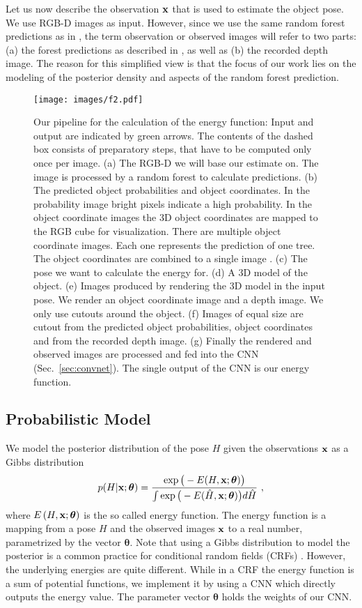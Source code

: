 \documentclass[10pt,letterpaper]{article}
\newcommand{\btheta}{\boldsymbol\theta}
\newcommand{\bx}{{\bf x}}
\begin{document}
Let us now describe the observation $\bx$ that is used to estimate the object pose. We use RGB-D images as input. However, since we use the same random forest predictions as in \cite{brachmann2014}, the term observation or observed images will refer to two parts: (a)
the forest predictions as described in \cite{brachmann2014}, as well as (b) the recorded depth image. The reason for this simplified view is that the focus of our work lies on the modeling of the posterior density and aspects of the random forest prediction.


\begin{figure}[!ht]
\begin{center}
\texttt{[image: images/f2.pdf]}
\end{center}
 \caption{Our pipeline for the calculation of the energy function: Input and output are indicated by green arrows. The contents of the dashed box consists of preparatory steps, that have to be computed only once per image. (a) The RGB-D we will base our estimate on. The image is processed by a random forest to calculate predictions. (b) The predicted object probabilities and object coordinates. In the probability image bright pixels indicate a high probability. In the object coordinate images the 3D object coordinates are mapped to the RGB cube for visualization. There are multiple object coordinate images. Each one represents the prediction of one tree. The object coordinates are combined to a single image \cite{brachmann2014}. (c) The pose we want to calculate the energy for. (d) A 3D model of the object. (e) Images produced by rendering the 3D model in the input pose. We render an object coordinate image and a depth image. We only use cutouts around the object. (f) Images of equal size are cutout from the predicted object probabilities, object coordinates and from the recorded depth image. (g) Finally the rendered  and observed images are processed and fed into the CNN (Sec.~\ref{sec:convnet}). The single output of the CNN is our energy function.}
\label{fig:architecture}
\end{figure}

\subsection{Probabilistic Model}
We model the posterior distribution of the pose $H$ given the observations $\bx$ as a Gibbs distribution
\begin{equation} \label{eq:Gibbs}
	p(H| \bx ;\btheta)=\frac{\exp \big( -E(H,\bx;\btheta) \big)} 
	{\int \exp \big(-E (\hat{H},\bx;\btheta )  \big) d \hat{H}} \ ,
\end{equation}
where $ E\left(H,\bx;\btheta \right)$ is the so called energy function.  The energy function is a mapping from a pose $H$ and the observed images $\bx$ to a real number, parametrized by the vector $\btheta$. Note that using a Gibbs distribution to model the posterior is a common practice for conditional random fields (CRFs) \cite{Lafferty01}. However, the underlying energies are quite different. While in a CRF the energy function is a sum of potential functions, we implement it by using a CNN which directly outputs the energy value. The parameter vector $\btheta$ holds the weights of our CNN.
\end{document}
